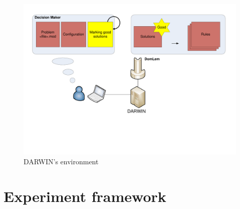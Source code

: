 \begin{figure}
  \centering \includegraphics[scale=0.5]{img/environ}
  \caption{DARWIN's environment}
  \label{environ}
\end{figure}

\section{Experiment framework}

